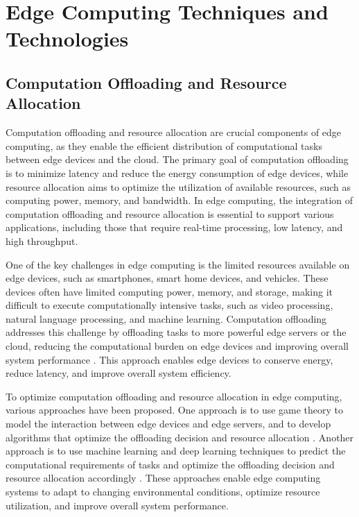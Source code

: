 \documentclass[11pt]{article}
\begin{document}
\section{Edge Computing Techniques and Technologies}

\subsection{Computation Offloading and Resource Allocation}

Computation offloading and resource allocation are crucial components of edge computing, as they enable the efficient distribution of computational tasks between edge devices and the cloud. The primary goal of computation offloading is to minimize latency and reduce the energy consumption of edge devices, while resource allocation aims to optimize the utilization of available resources, such as computing power, memory, and bandwidth. In edge computing, the integration of computation offloading and resource allocation is essential to support various applications, including those that require real-time processing, low latency, and high throughput.

One of the key challenges in edge computing is the limited resources available on edge devices, such as smartphones, smart home devices, and vehicles. These devices often have limited computing power, memory, and storage, making it difficult to execute computationally intensive tasks, such as video processing, natural language processing, and machine learning. Computation offloading addresses this challenge by offloading tasks to more powerful edge servers or the cloud, reducing the computational burden on edge devices and improving overall system performance \cite{ref66}. This approach enables edge devices to conserve energy, reduce latency, and improve overall system efficiency.

To optimize computation offloading and resource allocation in edge computing, various approaches have been proposed. One approach is to use game theory to model the interaction between edge devices and edge servers, and to develop algorithms that optimize the offloading decision and resource allocation \cite{ref67}. Another approach is to use machine learning and deep learning techniques to predict the computational requirements of tasks and optimize the offloading decision and resource allocation accordingly \cite{ref68}. These approaches enable edge computing systems to adapt to changing environmental conditions, optimize resource utilization, and improve overall system performance.
\end{document}
